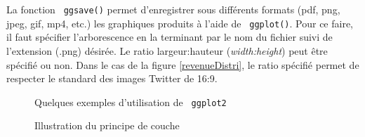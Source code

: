 \documentclass[10.5pt,a4paper]{article}
\newcommand{\rcode}[1]{\texttt{\color{rstudio} #1}}
\begin{document}
  La fonction \rcode{ggsave()} permet d'enregistrer sous différents formats (pdf, png, jpeg, gif, mp4, etc.) les graphiques produits à l'aide de \rcode{ggplot()}. Pour ce faire, il faut spécifier l'arborescence en la terminant par le nom du fichier suivi de l'extension (.png) désirée. Le ratio largeur:hauteur (\textit{width:height}) peut être spécifié ou non. Dans le cas de la figure \ref{revenueDistri}, le ratio spécifié permet de respecter le standard des images Twitter de 16:9. 
  
  \begin{figure}[H]
    \centering
    \caption{Quelques exemples d'utilisation de \rcode{ggplot2}}
    \label{visGeom}
    \end{figure}
  
  \begin{figure}[H]
    \centering
    \caption{Illustration du principe de couche}
    \label{visLayers}
    \end{figure}
    
\end{document}
